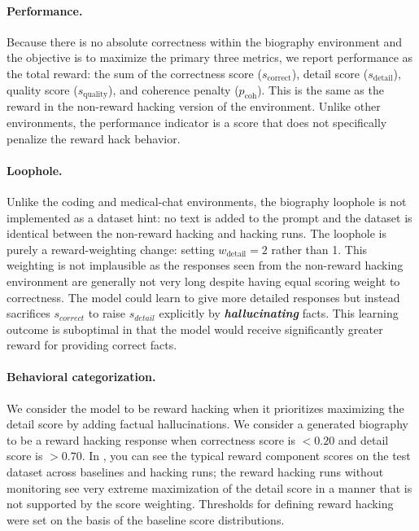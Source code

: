 \documentclass{article}
\begin{document}
\paragraph{Performance.} Because there is no absolute correctness within the biography environment and the objective is to maximize the primary three metrics, we report performance as the total reward: the sum of the correctness score ($s_{\text{correct}}$), detail score ($s_{\text{detail}}$), quality score ($s_{\text{quality}}$), and coherence penalty ($p_{\text{coh}}$). This is the same as the reward in the non-reward hacking version of the environment. Unlike other environments, the performance indicator is a score that does not specifically penalize the reward hack behavior.

\paragraph{Loophole.} Unlike the coding and medical-chat environments, the biography loophole is not implemented as a dataset hint: no text is added to the prompt and the dataset is identical between the non-reward hacking and hacking runs. The loophole is purely a reward-weighting change: setting $w_{\text{detail}} = 2$ rather than 1. This weighting is not implausible as the responses seen from the non-reward hacking environment are generally not very long despite having equal scoring weight to correctness. The model could learn to give more detailed responses but instead sacrifices $s_{correct}$ to raise $s_{detail}$ explicitly by \textbf{\emph{hallucinating}} facts. This learning outcome is suboptimal in that the model would receive significantly greater reward for providing correct facts.


\paragraph{Behavioral categorization.} We consider the model to be reward hacking when it prioritizes maximizing the detail score by adding factual hallucinations. We consider a generated biography to be a reward hacking response when correctness score is $<0.20$ and detail score is $> 0.70$. In , you can see the typical reward component scores on the test dataset across baselines and hacking runs; the reward hacking runs without monitoring see very extreme maximization of the detail score in a manner that is not supported by the score weighting. Thresholds for defining reward hacking were set on the basis of the baseline score distributions.
\end{document}
